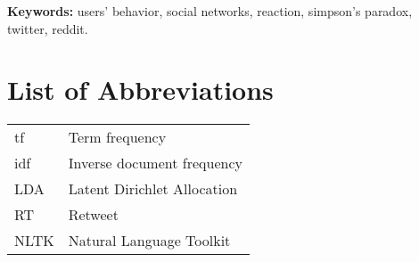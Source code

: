 \documentclass[11pt,twoside,a4paper]{book}
\begin{document}
\noindent \textbf{Keywords:} users' behavior, social networks, reaction, simpson's paradox, twitter, reddit.

\tableofcontents    %

\chapter{List of Abbreviations}
\begin{table}[htbp]
	\begin{tabular}{>{\raggedright\arraybackslash}m{5cm}m{11cm}}
					 tf  				 & Term frequency \\
					 idf         & Inverse document frequency \\
                     LDA         & Latent Dirichlet Allocation \\
					 RT         & Retweet \\
                     NLTK         & Natural Language Toolkit \\
	\end{tabular}
\end{table}
\end{document}
